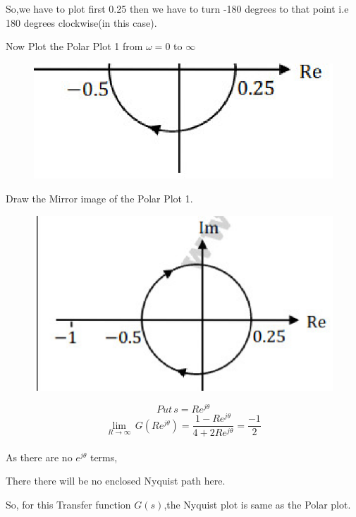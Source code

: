 \begin{enumerate}[label=\thesection.\arabic*.,ref=\thesection.\theenumi]
So,we have to plot first 0.25 then we have to turn {-180} degrees to that point i.e {180} degrees clockwise(in this case).

\bigskip

Now Plot the Polar Plot 1 from $\omega=0$ to $\infty$
\begin{figure}[!h]
\centering
\includegraphics[width=\columnwidth]{./figs/image2.eps}
\end{figure}

Draw the Mirror image of the Polar Plot 1.
\begin{figure}[!h]
\centering
\includegraphics[width=\columnwidth]{./figs/image1.eps}
 
\end{figure}

    $$Put\,s=Re^{j\theta}$$
    $$\lim_{R\to \infty}\,G(Re^{j\theta})=\frac{1-Re^{j\theta}}{4+2Re^{j\theta}}=\frac{-1}{2}$$ \\
    \bigskip
    As there are no $e^{j\theta}$ terms, 
    
    There there will be no enclosed Nyquist path here. 
    
    So, for this Transfer function $G(s)$,the Nyquist plot is same as the Polar plot.
    

\end{enumerate}
